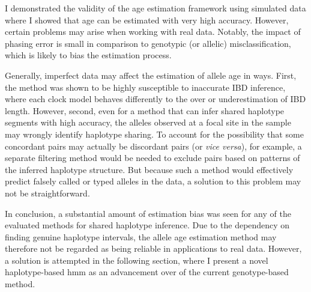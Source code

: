 I demonstrated the validity of the age estimation framework using simulated data where I showed that age can be estimated with very high accuracy.
However, certain problems may arise when working with real data.
Notably, the impact of phasing error is small in comparison to genotypic (or allelic) misclassification, which is likely to bias the estimation process.

Generally, imperfect data may affect the estimation of allele age in  ways.
First, the method was shown to be highly susceptible to inaccurate IBD inference, where each clock model behaves differently to the over or underestimation of IBD length.
However, second, even for a method that can infer shared haplotype segments with high accuracy, the alleles observed at a focal site in the sample may wrongly identify haplotype sharing.
To account for the possibility that some concordant pairs may actually be discordant pairs (or \emph{vice versa}), for example, a separate filtering method would be needed to exclude pairs based on patterns of the inferred haplotype structure.
But because such a method would effectively predict falsely called or typed alleles in the data, a solution to this problem may not be straightforward.


In conclusion, a substantial amount of estimation bias was seen for any of the evaluated methods for shared haplotype inference.
Due to the dependency on finding genuine haplotype intervals, the allele age estimation method may therefore not be regarded as being reliable in applications to real data.
However, a solution is attempted in the following section, where I present a novel haplotype-based \gls{hmm} as an advancement over of the current genotype-based method.










